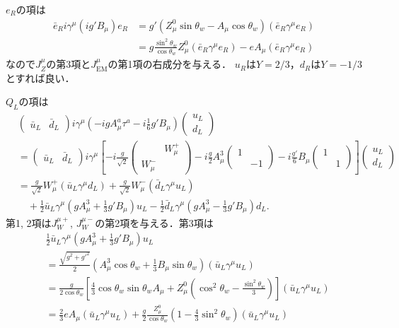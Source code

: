 $e_R$の項は
\begin{align*}
  \bar{e}_R i\gamma^\mu (ig'B_\mu) e_R
  &= g'(Z_\mu^0\sin\theta_w - A_\mu\cos\theta_w) (\bar{e}_R \gamma^\mu e_R) \\
  &= g \frac{\sin^2\theta_w}{\cos\theta_w} Z_\mu^0 (\bar{e}_R \gamma^\mu e_R)
  - e A_\mu (\bar{e}_R \gamma^\mu e_R)
\end{align*}
なので$J_Z^\mu$の第3項と$J_\text{EM}^\mu$の第1項の右成分を与える．
$u_R$は$Y=2/3$，$d_R$は$Y=-1/3$とすれば良い．

$Q_L$の項は
\begin{align*}
  &
  \begin{pmatrix}
    \bar{u}_L & \bar{d}_L
  \end{pmatrix}
  i\gamma^\mu \left( -igA_\mu^a \tau^a - i \frac{1}{6}g'B_\mu \right)
  \begin{pmatrix}
    u_L \\ d_L
  \end{pmatrix} \\
  &=
  \begin{pmatrix}
    \bar{u}_L & \bar{d}_L
  \end{pmatrix}
  i\gamma^\mu \left[ -i\frac{g}{\sqrt{2}}
  \begin{pmatrix}
    & W_\mu^+ \\ W_\mu^- &
  \end{pmatrix}
  - i \frac{g}{2} A_\mu^3
  \begin{pmatrix}
    1 & \\ & -1
  \end{pmatrix}
  - i \frac{g'}{6} B_\mu
  \begin{pmatrix}
    1 & \\ & 1
  \end{pmatrix}
  \right]
  \begin{pmatrix}
    u_L \\ d_L
  \end{pmatrix} \\
  &= \frac{g}{\sqrt{2}} W_\mu^+ (\bar{u}_L \gamma^\mu d_L)
  + \frac{g}{\sqrt{2}} W_\mu^- (\bar{d}_L \gamma^\mu u_L) \\
  &\quad + \frac{1}{2} \bar{u}_L \gamma^\mu \left(gA_\mu^3+\frac{1}{3}g'B_\mu\right) u_L
  - \frac{1}{2} \bar{d}_L \gamma^\mu \left(gA_\mu^3-\frac{1}{3}g'B_\mu\right) d_L .
\end{align*}
第1, 2項は$J_W^{\mu+}$, $J_W^{\mu-}$の第2項を与える．第3項は
\begin{align*}
  & \frac{1}{2} \bar{u}_L \gamma^\mu \left(gA_\mu^3+\frac{1}{3}g'B_\mu\right) u_L \\
  &= \frac{\sqrt{g^2+g'^2}}{2} \left(A_\mu^3\cos\theta_w+\frac{1}{3}B_\mu\sin\theta_w\right) (\bar{u}_L \gamma^\mu u_L) \\
  &= \frac{g}{2\cos\theta_w} \left[ \frac{4}{3} \cos\theta_w\sin\theta_w A_\mu + Z_\mu^0 \left(\cos^2\theta_w-\frac{\sin^2\theta_w}{3}\right) \right] (\bar{u}_L \gamma^\mu u_L)\\
  &= \frac{2}{3} e A_\mu (\bar{u}_L \gamma^\mu u_L)
  + \frac{g}{2} \frac{Z_\mu^0}{\cos\theta_w} \left(1-\frac{4}{3}\sin^2\theta_w\right) (\bar{u}_L \gamma^\mu u_L)
\end{align*}
